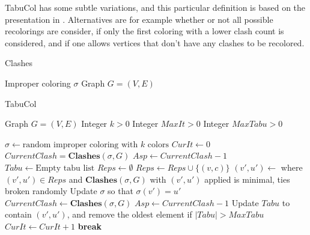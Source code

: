 \documentclass[a4paper]{article}
\newcommand{\algorithmicbreak}{\textbf{break}}
\newcommand{\BREAK}{\STATE \algorithmicbreak}
\begin{document}
TabuCol has some subtle variations, and this particular definition is based on
the presentation in \cite{Constructive}. Alternatives are for example whether or
not all possible recolorings are consider, if only the first coloring with a
lower clash count is considered, and if one allows vertices that don't have any
clashes to be recolored.

\begin{algorithm}[H]
    \caption{Clashes}
    \begin{algorithmic}[1]
        \REQUIRE Improper coloring $\sigma$
        \REQUIRE Graph $G = (V,E)$
    \end{algorithmic}
\end{algorithm}

\begin{algorithm}[H]
    \caption{TabuCol}
    \begin{algorithmic}[1]
        \REQUIRE Graph $G = (V,E)$
        \REQUIRE Integer $k > 0$
        \REQUIRE Integer $MaxIt > 0$
        \REQUIRE Integer $MaxTabu > 0$
      
        \STATE $\sigma \leftarrow \text{random improper coloring with $k$ colors}$
        \STATE $CurIt \leftarrow 0$
        \STATE $CurrentClash = \textbf{Clashes}(\sigma,G)$
        \STATE $Asp \leftarrow CurrentClash-1$
        \STATE $Tabu \leftarrow \text{Empty tabu list}$
            \STATE $Reps \leftarrow \emptyset$
                        \STATE $Reps \leftarrow Reps \cup \{(v,c)\}$
                    \ENDIF
                \ENDFOR
            \ENDFOR
            \STATE $(v',u') \leftarrow $ where $(v',u') \in Reps$ and $\textbf{Clashes}(\sigma,G)$ with $(v',u')$ applied is minimal, ties broken randomly
            \STATE Update $\sigma$ so that $\sigma(v') = u'$
            \STATE $CurrentClash \leftarrow \textbf{Clashes}(\sigma,G)$
                \STATE $Asp \leftarrow CurrentClash -1$
            \ENDIF
            \STATE Update $Tabu$ to contain $(v',u')$, and remove the oldest element if $|Tabu| > MaxTabu$
            \STATE $CurIt \leftarrow CurIt + 1$
                \BREAK
            \ENDIF
        \ENDWHILE
    \end{algorithmic}
\end{algorithm}
\end{document}
